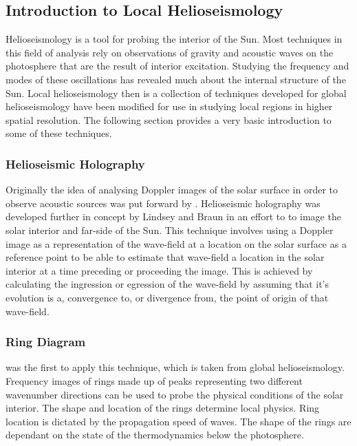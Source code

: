 \documentclass[11pt]{article}
\begin{document}
\subsection{Introduction to Local Helioseismology}\label{HSM}
Helioseismology is a tool for probing the interior of the Sun. Most techniques in this field of analysis rely on observations of gravity and acoustic waves on the photosphere that are the result of interior excitation. Studying the frequency and modes of these oscillations has revealed much about the internal structure of the Sun. Local helioseismology then is a collection of techniques developed for global helioseismology have been modified for use in studying local regions in higher spatial resolution. The following section provides a very basic introduction to some of these techniques. 

\subsubsection{Helioseismic Holography}\label{helioholog}
Originally the idea of analysing Doppler images of the solar surface in order to observe acoustic sources was put forward by \cite{1975CRASB.281...93R}. Helioseismic holography was developed further in concept by Lindsey and Braun \citep{1990SoPh..126..101L, 1992ApJ...392..739B, 1997ApJ...485..895L} in an effort to to image the solar interior and far-side of the Sun. This technique involves using a Doppler image as a representation of the wave-field at a location on the solar surface as a reference point to be able to estimate that wave-field a location in the solar interior at a time preceding or proceeding the image. This is achieved by calculating the ingression or egression of the wave-field by assuming that it's evolution is a, convergence to, or divergence from, the point of origin of that wave-field.  

\subsubsection{Ring Diagram}\label{ring}
\cite{1988ApJ...333..996H} was the first to apply this technique, which is taken from global helioseismology. Frequency images of rings made up of peaks representing two different wavenumber directions can be used to probe the physical conditions of the solar interior. The shape and location of the rings determine local physics. Ring location is dictated by the propagation speed of waves. The shape of the rings are dependant on the state of the thermodynamics below the photosphere.  
\end{document}
